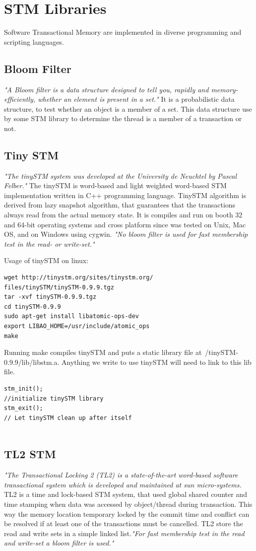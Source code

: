 \documentclass[12pt]{article}
\begin{document}
\section{STM Libraries}
Software Transactional Memory are implemented in diverse programming and scripting languages.
\subsection{Bloom Filter}
\textit{"A Bloom filter is a data structure designed to tell you, rapidly and memory-efficiently, whether an element is present in a set."}\cite{Bloom} It is a probabilistic data structure, to test whether an object is a member of a set. This data structure use by some STM library to determine the thread is a member of a transaction or not.

\subsection{Tiny STM}
\textit{"The tinySTM system was developed at the University de Neuchtel by Pascal Felber."}\cite{Olivier}  The tinySTM is word-based and light weighted word-based STM implementation written in C++ programming language. TinySTM algorithm is derived from lazy snapshot algorithm, that guarantees that the transactions always read from the actual memory state. It is compiles and run on booth 32 and 64-bit operating systems and cross platform since was tested on Unix, Mac OS, and on Windows using cygwin. \textit{"No bloom filter is used for fast membership test in the read- or write-set."}\cite{Olivier}

Usage of tinySTM on linux:\cite{Kalish}
\begin{lstlisting}
wget http://tinystm.org/sites/tinystm.org/
files/tinySTM/tinySTM-0.9.9.tgz
tar -xvf tinySTM-0.9.9.tgz
cd tinySTM-0.9.9
sudo apt-get install libatomic-ops-dev
export LIBAO_HOME=/usr/include/atomic_ops
make
\end{lstlisting}
Running make compiles tinySTM and puts a static library
file at~/tinySTM-0.9.9/lib/libstm.a. Anything we write
to use tinySTM will need to link to this lib file. 

\begin{lstlisting}
stm_init();
//initialize tinySTM library
stm_exit();
// Let tinySTM clean up after itself
	
\end{lstlisting}
\subsection{TL2 STM}
\textit{"The Transactional Locking 2 (TL2) is a state-of-the-art word-based software transactional system which is developed and maintained at sun micro-systems.}\cite{Olivier} TL2 is a time and lock-based STM system, that used global shared counter and time stamping when data was accessed by object/thread during transaction. This way the memory location temporary locked by the commit time and conflict can be resolved if at least one of the transactions must be cancelled. TL2 store the read and write sets in a simple linked list.\textit{"For fast membership test in the read and
write-set a bloom filter is used."}\cite{Olivier}
\end{document}
